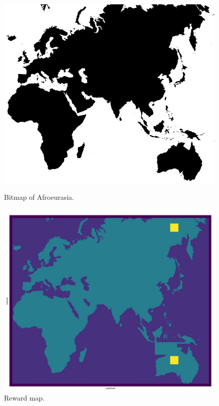 \documentclass[11pt]{article}
\begin{document}
\begin{figure}[h!]
    \centering
    \begin{minipage}{0.49\textwidth}
        \includegraphics[scale=0.25]{Files/Images/pure-bw-earth.jpg}
        \caption{Bitmap of Afroeurasia.}
    \end{minipage}
    \begin{minipage}{0.49\textwidth}
        \includegraphics[scale=0.15]{Files/Images/reward_map.jpg}
        \caption{Reward map.}
    \end{minipage}
    

\end{figure}
\end{document}
